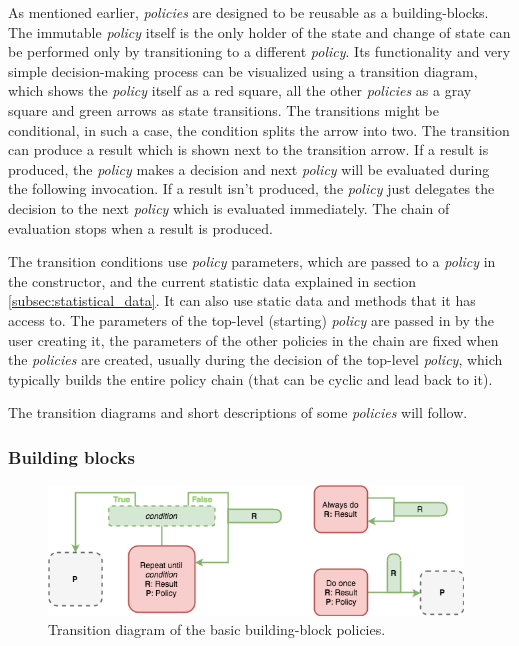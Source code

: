 As mentioned earlier, \textit{policies} are designed to be reusable as a building-blocks. The immutable \textit{policy} itself is the only holder of the state and change of state can be performed only by transitioning to a different \textit{policy}. Its functionality and very simple decision-making process can be visualized using a transition diagram, which shows the \textit{policy} itself as a red square, all the other \textit{policies} as a gray square and green arrows as state transitions. The transitions might be conditional, in such a case, the condition splits the arrow into two. The transition can produce a result which is shown next to the transition arrow. If a result is produced, the \textit{policy} makes a decision and next \textit{policy} will be evaluated during the following invocation. If a result isn't produced, the \textit{policy} just delegates the decision to the next \textit{policy} which is evaluated immediately. The chain of evaluation stops when a result is produced.

The transition conditions use \textit{policy} parameters, which are passed to a \textit{policy} in the constructor, and the current statistic data explained in section \ref{subsec:statistical_data}. It can also use static data and methods that it has access to. The parameters of the top-level (starting) \textit{policy} are passed in by the user creating it, the parameters of the other policies in the chain are fixed when the \textit{policies} are created, usually during the decision of the top-level \textit{policy}, which typically builds the entire policy chain (that can be cyclic and lead back to it).

The transition diagrams and short descriptions of some \textit{policies} will follow.

\subsubsection{Building blocks}

\begin{figure}[h!]
	\captionsetup{justification=centering,margin=0.5cm}
	\centerline{\mbox{\includegraphics[width=110mm]{./img/helper_policies.png}}}
	\caption{Transition diagram of the basic building-block policies.}
	\label{fig:helper_policies}
\end{figure}

